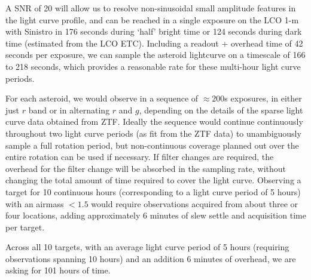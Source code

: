 \documentclass[11pt]{article}
\begin{document}
A SNR of 20 will allow us to resolve non-sinusoidal small amplitude
features in the light curve profile, and can be reached in a single
exposure on the LCO 1-m with Sinistro in 176 seconds during
`half' bright time or 124 seconds during dark time (estimated from the
LCO ETC). Including a readout + overhead time of 42 seconds per
exposure, we can sample the asteroid lightcurve on a timescale of 166
to 218 seconds, which provides a reasonable rate for these multi-hour
light curve periods.

For each asteroid, we would observe in a sequence of $\approx200$s
exposures, in either just $r$ band or in alternating $r$ and $g$,
depending on the details of the sparse light curve data obtained from
ZTF. Ideally the sequence would continue continuously throughout two light curve periods
(as fit from the ZTF data) to unambiguously sample a full rotation
period, but non-continuous coverage planned out over the entire rotation 
can be used if necessary. If filter changes are required, the overhead for the filter change will
be absorbed in the sampling rate, without changing the total 
amount of time required to cover the light curve. Observing a target for 
10 continuous hours (corresponding to a light curve period of 5 hours) with an airmass $<1.5$
would require observations acquired from about three or four locations, adding approximately
6 minutes of slew settle and acquisition time per target.

Across all 10 targets, with an average light curve period of 5 hours (requiring observations
spanning 10 hours) and an addition 6 minutes of overhead, we are asking for 101 hours of time.


%
%
\end{document}
